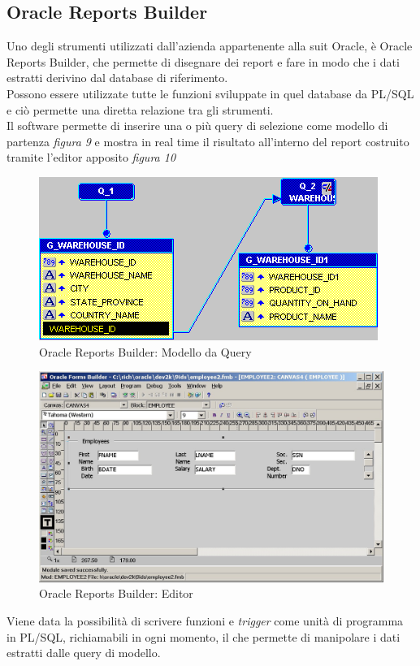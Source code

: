 \subsection{Oracle Reports Builder}
Uno degli strumenti utilizzati dall'azienda appartenente alla suit Oracle, è Oracle Reports Builder, che permette di disegnare dei report e fare in modo che i dati estratti derivino dal database di riferimento.\\
Possono essere utilizzate tutte le funzioni sviluppate in quel database da PL/SQL e ciò permette una diretta relazione tra gli strumenti.\\
Il software permette di inserire una o più query di selezione come modello di partenza \textit{figura 9} e mostra in real time il risultato all'interno del report costruito tramite l'editor apposito \textit{figura 10}
\newpage
\begin{figure}[!h]
\thispagestyle{empty}
\centering
\includegraphics[scale=0.83]{img/Modelbasic.png}
\caption{Oracle Reports Builder: Modello da Query}
\end{figure}\begin{figure}[!h]
\thispagestyle{empty}
\centering
\includegraphics[scale=0.50]{img/Editor.jpg}
\caption{Oracle Reports Builder: Editor}
\end{figure}
Viene data la possibilità di scrivere funzioni e \textit{trigger} come unità di programma in PL/SQL, richiamabili in ogni momento, il che permette di manipolare i dati estratti dalle query di modello.

